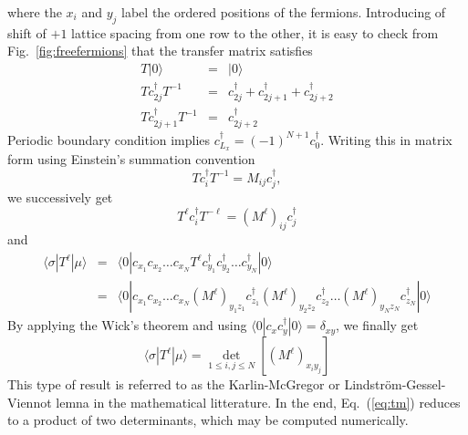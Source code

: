 \documentclass[11pt]{iopart}
\begin{document}
where the $x_i$ and $y_j$ label the ordered positions of the fermions. Introducing of shift of $+1$ lattice spacing from one row to the other, it is easy to check from Fig.~\ref{fig:freefermions} that the transfer matrix satisfies
\begin{eqnarray}
T|0\rangle&=&|0\rangle\\
T c_{2j}^\dag T^{-1}&=&c_{2j}^\dag+c_{2j+1}^\dag +c_{2j+2}^\dag\\
T c_{2j+1}^\dag T^{-1}&=&c_{2j+2}^\dag
\end{eqnarray}
Periodic boundary condition implies $c_{L_x}^\dag=(-1)^{N+1}c_0^\dag$. Writing this in matrix form using Einstein's summation convention
\begin{equation}
 T c_i^\dag T^{-1}=M_{ij} c_j^\dag,
\end{equation}
we successively get
\begin{equation}
 T^\ell c_i^\dag T^{-\ell}=\left(M^\ell\right)_{ij} c_j^\dag
\end{equation}
and 
\begin{eqnarray}
\langle \sigma |T^\ell |\mu\rangle&=&\langle 0|c_{x_1} c_{x_2} \ldots c_{x_N} T^{\ell} c_{y_1}^\dag c_{y_2}^\dag \ldots c_{y_N}^\dag |0\rangle \\ 
&=&\langle 0|c_{x_1} c_{x_2} \ldots c_{x_N} (M^\ell)_{y_1 z_1}c_{z_1}^\dag (M^\ell)_{y_2 z_2}c_{z_2}^\dag \ldots (M^\ell)_{y_N z_N}c_{z_N}^\dag|0\rangle
\end{eqnarray}
By applying the Wick's theorem and using $\langle 0|c_x c_y^\dag|0\rangle=\delta_{xy}$, we finally get
\begin{equation}
 \langle \sigma |T^\ell |\mu\rangle=\det_{1\leq i,j\leq N} \left[(M^\ell)_{x_i y_j}\right]
\end{equation}
This type of result is referred to as the Karlin-McGregor\cite{KarlinMcGregor} or Lindstr\"om-Gessel-Viennot\cite{Lindstrom1973,GesselViennot1989} lemna in the mathematical litterature. In the end, Eq.~(\ref{eq:tm}) reduces to a product of two determinants, which may be computed numerically.
\end{document}
